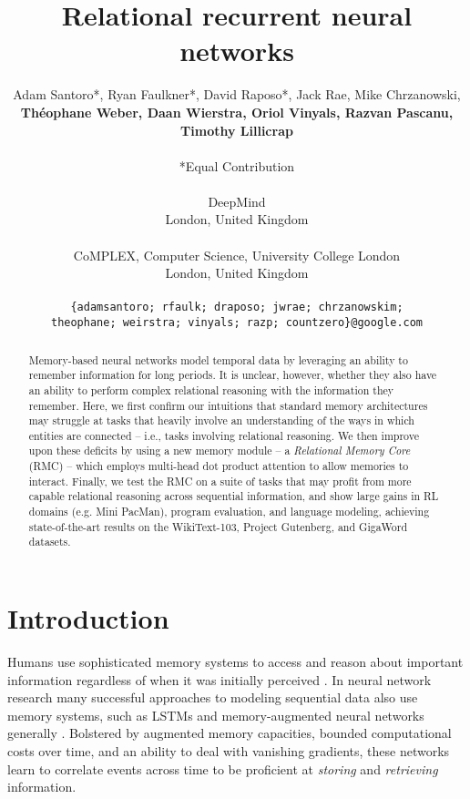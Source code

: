 \documentclass{article}
\title{Relational recurrent neural networks}
\author{
Adam Santoro*, Ryan Faulkner*, David Raposo*, Jack Rae, Mike Chrzanowski,\\
\textbf{Th\'eophane Weber, Daan Wierstra, Oriol Vinyals, Razvan Pascanu, Timothy Lillicrap}\\
\\
*Equal Contribution\\
\\
DeepMind\\
London, United Kingdom\\
\\
CoMPLEX, Computer Science, University College London\\
London, United Kingdom\\
\\
\small\texttt{\{adamsantoro; rfaulk; draposo; jwrae; chrzanowskim;}\\
\small\texttt{theophane; weirstra; vinyals; razp; countzero\}@google.com}
}
\begin{document}
\maketitle

\begin{abstract}
Memory-based neural networks model temporal data by leveraging an ability to remember information for long periods. It is unclear, however, whether they also have an ability to perform complex relational reasoning with the information they remember. Here, we first confirm our intuitions that standard memory architectures may struggle at tasks that heavily involve an understanding of the ways in which entities are connected -- i.e., tasks involving relational reasoning. We then improve upon these deficits by using a new memory module -- a \textit{Relational Memory Core} (RMC) -- which employs multi-head dot product attention to allow memories to interact. Finally, we test the RMC on a suite of tasks that may profit from more capable relational reasoning across sequential information, and show large gains in RL domains (e.g. Mini PacMan), program evaluation, and language modeling, achieving state-of-the-art results on the WikiText-103, Project Gutenberg, and GigaWord datasets.
\end{abstract}

\section{Introduction}

Humans use sophisticated memory systems to access and reason about important information regardless of when it was initially perceived \citep{schacter1994memory, knowlton2012neurocomputational}. In neural network research many successful approaches to modeling sequential data also use memory systems, such as LSTMs \citep{hochreiter1998lstm} and memory-augmented neural networks generally \citep{graves2014neural,graves2016hybrid,santoro2016meta,sukhbaatar2015end}. Bolstered by augmented memory capacities, bounded computational costs over time, and an ability to deal with vanishing gradients, these networks learn to correlate events across time to be proficient at \textit{storing} and \textit{retrieving} information.
\end{document}
